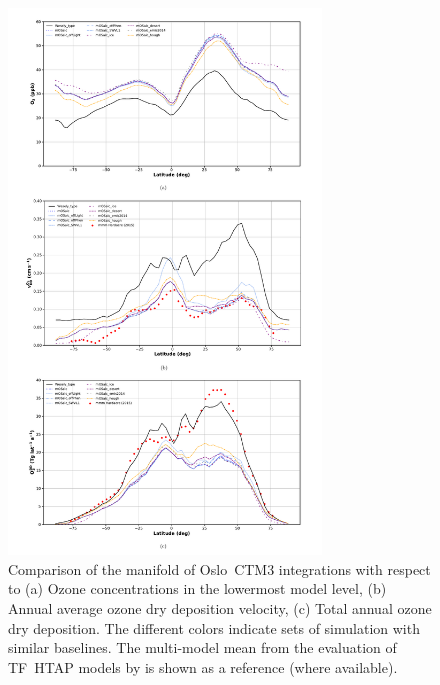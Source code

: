 \documentclass[gmd, manuscript]{copernicus}
\begin{document}
\begin{figure}[t]
  \includegraphics[width=8.3cm]{fig05}
  \caption{Comparison of the manifold of Oslo~CTM3 integrations with respect to (a) Ozone concentrations in the lowermost model level, (b) Annual average ozone dry deposition velocity, (c) Total annual ozone dry deposition. The different colors indicate sets of simulation with similar baselines. The multi-model mean from the evaluation of TF~HTAP models by \citet{ACP:Hardacre2015} is shown as a reference (where available).}
  \label{fig:mmm_drydep}
\end{figure}
%
\end{document}
